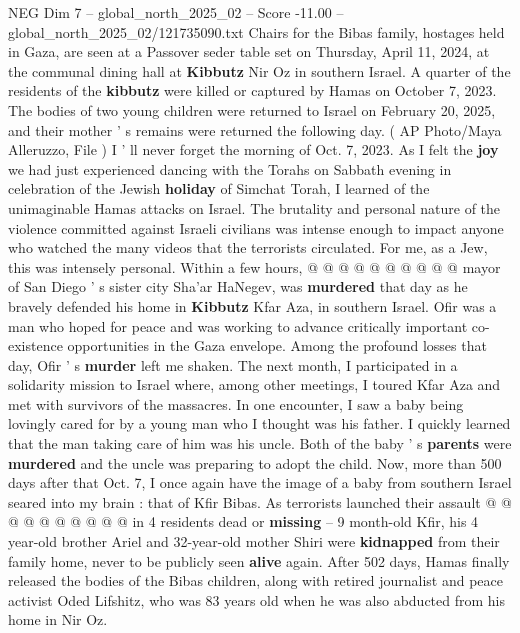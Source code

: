 \begin{textsample}{NEG Dim 7 – global\_north\_2025\_02 – Score -11.00 – global\_north\_2025\_02/121735090.txt}  \label{ex:f7_neg_062}
Chairs for the Bibas family, hostages held in Gaza, are seen at a Passover seder table set on Thursday, April 11, 2024, at the communal dining hall at \textbf{Kibbutz} Nir Oz in southern Israel.
A quarter of the residents of the \textbf{kibbutz} were killed or captured by Hamas on October 7, 2023.
The bodies of two young children were returned to Israel on February 20, 2025, and their mother ' s remains were returned the following day. ( AP Photo/Maya Alleruzzo, File ) I ' ll never forget the morning of Oct. 7, 2023.
As I felt the \textbf{joy} we had just experienced dancing with the Torahs on Sabbath evening in celebration of the Jewish \textbf{holiday} of Simchat Torah, I learned of the unimaginable Hamas attacks on Israel.
The brutality and personal nature of the violence committed against Israeli civilians was intense enough to impact anyone who watched the many videos that the terrorists circulated.
For me, as a Jew, this was intensely personal.
Within a few hours, @ @ @ @ @ @ @ @ @ @ mayor of San Diego ' s sister city Sha'ar HaNegev, was \textbf{murdered} that day as he bravely defended his home in \textbf{Kibbutz} Kfar Aza, in southern Israel.
Ofir was a man who hoped for peace and was working to advance critically important co-existence opportunities in the Gaza envelope.
Among the profound losses that day, Ofir ' s \textbf{murder} left me shaken.
The next month, I participated in a solidarity mission to Israel where, among other meetings, I toured Kfar Aza and met with survivors of the massacres.
In one encounter, I saw a baby being lovingly cared for by a young man who I thought was his father.
I quickly learned that the man taking care of him was his uncle.
Both of the baby ' s \textbf{parents} were \textbf{murdered} and the uncle was preparing to adopt the child.
Now, more than 500 days after that Oct. 7, I once again have the image of a baby from southern Israel seared into my brain : that of Kfir Bibas.
As terrorists launched their assault @ @ @ @ @ @ @ @ @ @ in 4 residents dead or \textbf{missing} -- 9 month-old Kfir, his 4 year-old brother Ariel and 32-year-old mother Shiri were \textbf{kidnapped} from their family home, never to be publicly seen \textbf{alive} again.
After 502 days, Hamas finally released the bodies of the Bibas children, along with retired journalist and peace activist Oded Lifshitz, who was 83 years old when he was also abducted from his home in Nir Oz.

\end{textsample}
